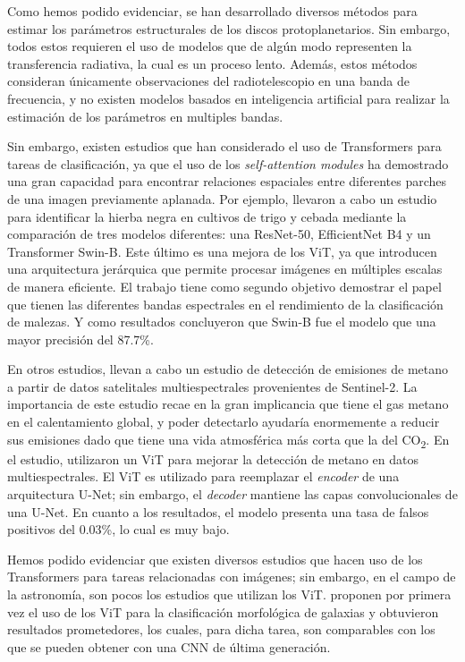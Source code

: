 Como hemos podido evidenciar, se han desarrollado diversos métodos para estimar los parámetros estructurales de los discos protoplanetarios. Sin embargo, todos estos requieren el uso de modelos que de algún modo representen la transferencia radiativa, la cual es un proceso lento. Además, estos métodos consideran únicamente observaciones del radiotelescopio en una banda de frecuencia, y no existen modelos basados en inteligencia artificial para realizar la estimación de los parámetros en multiples bandas.

Sin embargo, existen estudios que han considerado el uso de Transformers para tareas de clasificación, ya que el uso de los \textit{self-attention modules} ha demostrado una gran capacidad para encontrar relaciones espaciales entre diferentes parches de una imagen previamente aplanada. Por ejemplo, \cite{2024arXiv240502218D} llevaron a cabo un estudio para identificar la hierba negra en cultivos de trigo y cebada mediante la comparación de tres modelos diferentes: una ResNet-50, EfficientNet B4 y un Transformer Swin-B. Este último es una mejora de los ViT, ya que introducen una arquitectura jerárquica que permite procesar imágenes en múltiples escalas de manera eficiente. El trabajo tiene como segundo objetivo demostrar el papel que tienen las diferentes bandas espectrales en el rendimiento de la clasificación de malezas. Y como resultados concluyeron que Swin-B fue el modelo que una mayor precisión del 87.7\%.

En otros estudios, \cite{Rouet-Leduc_Hulbert_2024} llevan a cabo un estudio de detección de emisiones de metano a partir de datos satelitales multiespectrales provenientes de Sentinel-2. La importancia de este estudio recae en la gran implicancia que tiene el gas metano en el calentamiento global, y poder detectarlo ayudaría enormemente a reducir sus emisiones dado que tiene una vida atmosférica más corta que la del CO\textsubscript{2}. En el estudio, \cite{Rouet-Leduc_Hulbert_2024} utilizaron un ViT para mejorar la detección de metano en datos multiespectrales. El ViT es utilizado para reemplazar el \textit{encoder} de una arquitectura U-Net; sin embargo, el \textit{decoder} mantiene las capas convolucionales de una U-Net. En cuanto a los resultados, el modelo presenta una tasa de falsos positivos del 0.03\%, lo cual es muy bajo.

Hemos podido evidenciar que existen diversos estudios que hacen uso de los Transformers para tareas relacionadas con imágenes; sin embargo, en el campo de la astronomía, son pocos los estudios que utilizan los ViT. \cite{lin2022galaxy} proponen por primera vez el uso de los ViT para la clasificación morfológica de galaxias y obtuvieron resultados prometedores, los cuales, para dicha tarea, son comparables con los que se pueden obtener con una CNN de última generación.



